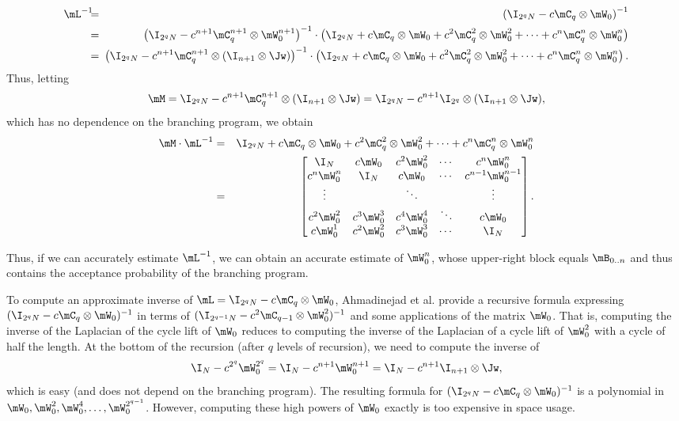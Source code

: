 \documentclass[11pt]{article}
\begin{document}
    \begin{eqnarray*}
    \mL^{-1} \!\!\! &=&\!\!\!\! \left(\I_{2^qN} - c \mC_q\otimes \mW_0\right)^{-1}\\
    &=& \!\!\! \left(\I_{2^qN} - c^{n+1} \mC_q^{n+1} \otimes \mW_0^{n+1}\right)^{-1}\cdot
    \left(\I_{2^qN} + c \mC_q\otimes \mW_0 +c^2 \mC^2_q\otimes \mW_0^2 + \cdots +
    c^n \mC^n_q\otimes \mW_0^n\right)\\
    &=& \!\!\! \left(\I_{2^qN} - c^{n+1} \mC_q^{n+1}\otimes(\I_{n+1} \otimes \Jw)\right)^{-1} \cdot 
        \left(\I_{2^qN} + c \mC_q\otimes \mW_0 +c^2 \mC^2_q\otimes \mW_0^2 + \cdots +
    c^n \mC^n_q\otimes \mW_0^n\right).  %
    \end{eqnarray*}
%
    Thus, letting $$\mM = \I_{2^qN} - c^{n+1} \mC_q^{n+1}\otimes(\I_{n+1} \otimes \Jw)= \I_{2^qN} - c^{n+1} \I_{2^q}\otimes(\I_{n+1} \otimes \Jw),$$
    which has no dependence on the branching program,
    we %
    obtain %
    \begin{eqnarray*}
    \mM\cdot \mL^{-1}
    &=& \I_{2^qN} + c \mC_q\otimes \mW_0 +c^2 \mC^2_q\otimes \mW_0^2 + \cdots + 
    c^n \mC^n_q\otimes \mW_0^n\\
    &=&
    \begin{bmatrix}
    \I_N & c\mW_0 & c^2\mW_0^2 & \cdots & c^n\mW_0^n \\
    c^n\mW_0^n & \I_N & c\mW_0 & \cdots & c^{n-1}\mW_0^{n-1} \\
    \vdots & & \ddots & & \vdots\\
    c^2\mW_0^2 & c^3\mW_0^3 & c^4\mW_0^4 & \ddots & c\mW_0\\
    c\mW_0^1 & c^2\mW_0^2 & c^3\mW_0^3 & \cdots &  \I_N \\
    \end{bmatrix}.
    \end{eqnarray*}

    Thus, if we can accurately estimate $\mL^{-1}$, we can
    obtain an accurate estimate of  $\mW_0^n$, whose upper-right block equals $\mB_{0..n}$ and thus contains the acceptance probability of the 
    branching program.
    
    To compute an approximate inverse of $\mL=\I_{2^qN} - c \mC_q \otimes \mW_0$, 
%
Ahmadinejad  %
et al. provide a recursive formula
    expressing $(\I_{2^qN} - c \mC_q \otimes \mW_0)^{-1}$ in terms of
    $(\I_{2^{q-1}N} - c^2 \mC_{q-1} \otimes \mW^2_0)^{-1}$ and some applications of the matrix $\mW_0$.
    That is, computing the inverse of the Laplacian of the cycle lift of $\mW_0$ reduces
    to computing the inverse of the Laplacian of a cycle lift of $\mW_0^2$ with a cycle of half the length.  At the bottom of the recursion (after $q$ levels of recursion), we need to compute the inverse of $$\I_N-c^{2^q}\mW_0^{2^q} = \I_N - c^{n+1}\mW_0^{n+1} = \I_N - c^{n+1} \I_{n+1}\otimes \Jw,$$
    which is easy (and does not depend on the branching program).
    The resulting formula for $(\I_{2^qN} - c \mC_q \otimes \mW_0)^{-1}$
    is a polynomial in $\mW_0,\mW_0^2,\mW_0^4,\ldots,\mW_0^{2^{q-1}}$.
    However, computing these high powers of $\mW_0$ exactly is too expensive in space usage.  
    
\end{document}
